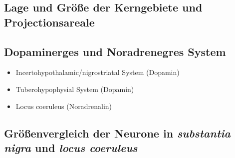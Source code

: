 \documentclass[12pt,a4paper,pdftex]{article}
\begin{document}
\subsection{Lage und Größe der Kerngebiete und Projectionsareale}
\subsection{Dopaminerges und Noradrenegres System}
\begin{itemize}
    \item Incertohypothalamic/nigrostriatal System (Dopamin)
    \item Tuberohypophysial System (Dopamin)
    \item Locus coeruleus (Noradrenalin)
\end{itemize}
\subsection{Größenvergleich der Neurone in \textit{substantia nigra} und \textit{locus coeruleus}}




\newpage



\printindex
\end{document}
